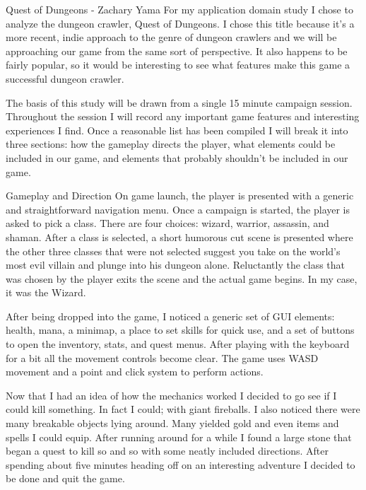 \documentclass[12pt]{report}
\begin{document}
\begin{section}{Quest of Dungeons - Zachary Yama}
For my application domain study I chose to analyze the dungeon crawler,
Quest of Dungeons. I chose this title because it’s a more recent, indie
approach to the genre of dungeon crawlers and we will be approaching our
game from the same sort of perspective. It also happens to be fairly
popular, so it would be interesting to see what features make this game a
successful dungeon crawler.
 
The basis of this study will be drawn from a single 15 minute campaign
session. Throughout the session I will record any important game features
and interesting experiences I find. Once a reasonable list has been
compiled I will break it into three sections: how the gameplay directs 
the player, what elements could be included in our game, and elements that
probably shouldn’t be included in our game.
 
\begin{subsection}{Gameplay and Direction}
On game launch, the player is presented with a generic and straightforward
navigation menu. Once a campaign is started, the player is asked to pick a
class. There are four choices: wizard, warrior, assassin, and shaman. After
a class is selected, a short humorous cut scene is presented where the
other three classes that were not selected suggest you take on the world’s
most evil villain and plunge into his dungeon alone. Reluctantly the class
that was chosen by the player exits the scene and the actual game begins.
In my case, it was the Wizard.
 
After being dropped into the game, I noticed a generic set of GUI elements:
health, mana, a minimap, a place to set skills for quick use, and a set of
buttons to open the inventory, stats, and quest menus. After playing with
the keyboard for a bit all the movement controls become clear. The game
uses WASD movement and a point and click system to perform actions.
 
Now that I had an idea of how the mechanics worked I decided to go see if I
could kill something. In fact I could; with giant fireballs. I also noticed
there were many breakable objects lying around. Many yielded gold and even
items and spells I could equip. After running around for a while I found a
large stone that began a quest to kill so and so with some neatly included 
directions. After spending about five minutes heading off on an interesting
adventure I decided to be done and quit the game.
\end{subsection}
 

\end{section}
\end{document}
